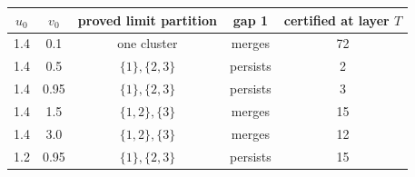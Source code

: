 \begin{tabular}{ccccc}
\toprule
$u_0$ & $v_0$ & proved limit partition & gap 1 & certified at layer $T$\\
\midrule
1.4 & 0.1 & one cluster & merges & 72\\
1.4 & 0.5 & $\{1\},\{2,3\}$ & persists & 2\\
1.4 & 0.95 & $\{1\},\{2,3\}$ & persists & 3\\
1.4 & 1.5 & $\{1,2\},\{3\}$ & merges & 15\\
1.4 & 3.0 & $\{1,2\},\{3\}$ & merges & 12\\
1.2 & 0.95 & $\{1\},\{2,3\}$ & persists & 15\\
\bottomrule
\end{tabular}
